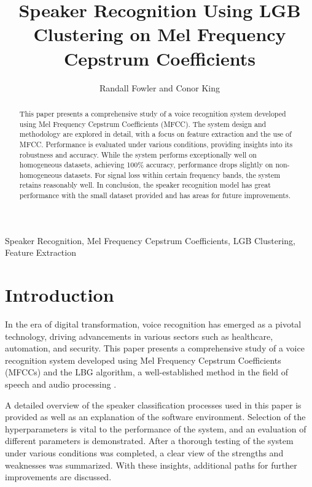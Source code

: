 \documentclass[conference]{IEEEtran}
\begin{document}
\graphicspath{{figures/}} %

\title{Speaker Recognition Using LGB Clustering on Mel Frequency Cepstrum Coefficients}

\author{
    Randall Fowler and Conor King
}

\maketitle

\begin{abstract}
    This paper presents a comprehensive study of a voice recognition system developed using Mel Frequency Cepstrum Coefficients (MFCC). The system design and methodology are explored in detail, with a focus on feature extraction and the use of MFCC. Performance is evaluated under various conditions, providing insights into its robustness and accuracy. While the system performs exceptionally well on homogeneous datasets, achieving 100\% accuracy, performance drops slightly on non-homogeneous datasets. For signal loss within certain frequency bands, the system retains reasonably well. In conclusion, the speaker recognition model has great performance with the small dataset provided and has areas for future improvements.
\end{abstract}

\begin{IEEEkeywords}
Speaker Recognition, Mel Frequency Cepstrum Coefficients, LGB Clustering, Feature Extraction
\end{IEEEkeywords}

\section{Introduction}
In the era of digital transformation, voice recognition has emerged as a pivotal technology, driving advancements in various sectors such as healthcare, automation, and security. This paper presents a comprehensive study of a voice recognition system developed using Mel Frequency Cepstrum Coefficients (MFCCs) and the LBG algorithm, a well-established method in the field of speech and audio processing \cite{lgb_paper}.

A detailed overview of the speaker classification processes used in this paper is provided as well as an explanation of the software environment. Selection of the hyperparameters is vital to the performance of the system, and an evaluation of different parameters is demonstrated. After a thorough testing of the system under various conditions was completed, a clear view of the strengths and weaknesses was summarized. With these insights, additional paths for further improvements are discussed.
\end{document}
